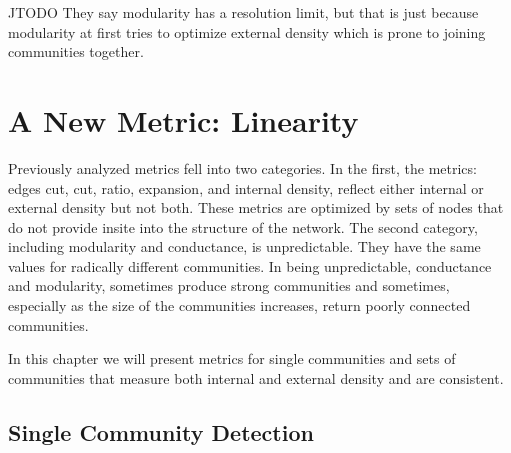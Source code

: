 \documentclass[phd,tocprelim]{cornell}
\begin{document}
JTODO They say modularity has a resolution limit, but that is just because modularity at first tries to optimize external density which is prone to joining communities together. \cite{JTODO}






\chapter{A New Metric: Linearity}

Previously analyzed metrics fell into two categories.  In the first, the metrics: edges cut, cut, ratio, expansion, and internal density, reflect either internal or external density but not both.  These metrics are optimized by sets of nodes that do not provide insite into the structure of the network.  The second category, including modularity and conductance, is unpredictable.  They have the same values for radically different communities.  In being unpredictable, conductance and modularity, sometimes produce strong communities and sometimes, especially as the size of the communities increases, return poorly connected communities\cite{JTODO}.

In this chapter we will present metrics for single communities and sets of communities that measure both internal and external density and are consistent.


\section{Single Community Detection}
\end{document}
